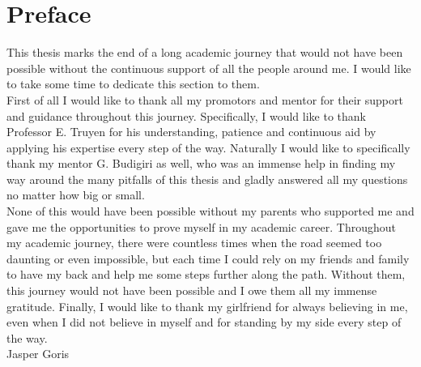 \chapter{Preface}                                 \label{ch:preface}
This thesis marks the end of a long academic journey that would not have been possible without the continuous support of all the people around me. I would like to take some time to dedicate this section to them.
\\[10pt]

First of all I would like to thank all my promotors and mentor for their support and guidance throughout this journey. Specifically, I would like to thank Professor E. Truyen for his understanding, patience and continuous aid by applying his expertise every step of the way. Naturally I would like to specifically thank my mentor G. Budigiri as well, who was an immense help in finding my way around the many pitfalls of this thesis and gladly answered all my questions no matter how big or small.
\\[10pt]

None of this would have been possible without my parents who supported me and gave me the opportunities to prove myself in my academic career. Throughout my academic journey, there were countless times when the road seemed too daunting or even impossible, but each time I could rely on my friends and family to have my back and help me some steps further along the path. Without them, this journey would not have been possible and I owe them all my immense gratitude.
Finally, I would like to thank my girlfriend for always believing in me, even when I did not believe in myself and for standing by my side every step of the way.
\\[10pt]

Jasper Goris
\cleardoublepage
